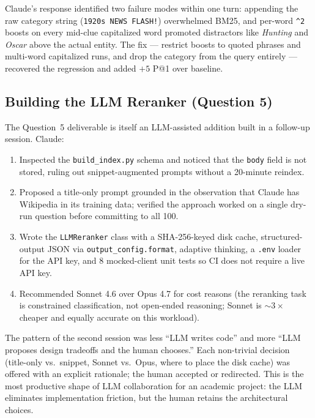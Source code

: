 \documentclass[11pt]{article}
\begin{document}
Claude's response identified two failure modes within one turn:
appending the raw category string (\texttt{1920s NEWS FLASH!})
overwhelmed BM25, and per-word \texttt{\^{}2} boosts on every
mid-clue capitalized word promoted distractors like \emph{Hunting}
and \emph{Oscar} above the actual entity. The fix --- restrict
boosts to quoted phrases and multi-word capitalized runs, and drop
the category from the query entirely --- recovered the regression
and added $+5$ P@1 over baseline.

\subsection{Building the LLM Reranker (Question 5)}

The Question~5 deliverable is itself an LLM-assisted addition built in
a follow-up session. Claude:

\begin{enumerate}
  \item Inspected the \texttt{build\_index.py} schema and noticed that
        the \texttt{body} field is not stored, ruling out
        snippet-augmented prompts without a 20-minute reindex.
  \item Proposed a title-only prompt grounded in the observation that
        Claude has Wikipedia in its training data; verified the
        approach worked on a single dry-run question before committing
        to all 100.
  \item Wrote the \texttt{LLMReranker} class with a SHA-256-keyed disk
        cache, structured-output JSON via \texttt{output\_config.format},
        adaptive thinking, a \texttt{.env} loader for the API key,
        and 8 mocked-client unit tests so CI does not require a live
        API key.
  \item Recommended Sonnet 4.6 over Opus 4.7 for cost reasons (the
        reranking task is constrained classification, not open-ended
        reasoning; Sonnet is $\sim$$3\times$ cheaper and equally
        accurate on this workload).
\end{enumerate}

The pattern of the second session was less ``LLM writes code'' and
more ``LLM proposes design tradeoffs and the human chooses.'' Each
non-trivial decision (title-only vs.\ snippet, Sonnet vs.\ Opus, where
to place the disk cache) was offered with an explicit rationale; the
human accepted or redirected. This is the most productive shape of
LLM collaboration for an academic project: the LLM eliminates
implementation friction, but the human retains the architectural
choices.
\end{document}
